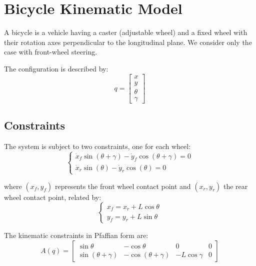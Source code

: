 \documentclass[openany]{book}
\theoremstyle{definition}
\theoremstyle{remark}
\newcommand{\definitionbox}[1]{
\begin{tcolorbox}[colback=blue!5,colframe=blue!40!black,title=Definition]
 #1
\end{tcolorbox}
}
\begin{document}
\section{Bicycle Kinematic Model}

\definitionbox{A bicycle is a vehicle having a caster (adjustable wheel) and a fixed wheel with their rotation axes perpendicular to the longitudinal plane. We consider only the case with front-wheel steering.}

The configuration is described by:
\begin{equation}
    q = \begin{bmatrix}x\\y\\\theta\\\gamma\end{bmatrix}
\end{equation}

\subsection{Constraints}
The system is subject to two constraints, one for each wheel:
\begin{equation}
    \begin{cases}
        \dot{x}_f \sin(\theta + \gamma) - \dot{y}_f \cos(\theta + \gamma) = 0\\
        \dot{x}_r \sin(\theta) - \dot{y}_r \cos(\theta) = 0
    \end{cases}
\end{equation}

where $(x_f, y_f)$ represents the front wheel contact point and $(x_r, y_r)$ the rear wheel contact point, related by:
\begin{equation}
    \begin{cases}
        x_f = x_r + L\cos\theta\\
        y_f = y_r + L\sin\theta
    \end{cases}
\end{equation}

The kinematic constraints in Pfaffian form are:
\begin{equation}
    A(q) = \begin{bmatrix}
        \sin\theta & -\cos\theta & 0 & 0\\
        \sin(\theta + \gamma) & -\cos(\theta + \gamma) & -L\cos\gamma & 0
    \end{bmatrix}
\end{equation}
\end{document}

